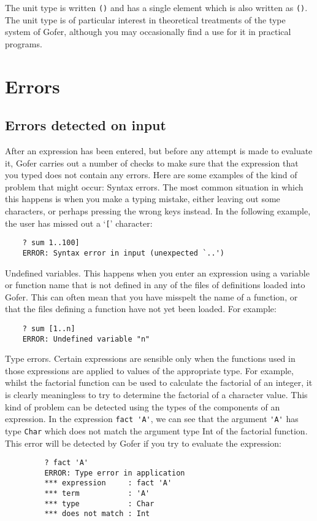 The unit type is written \verb"()" and has a  single  element  which  is  also
written as \verb"()".  The unit type is of particular interest in  theoretical
treatments of the type system of Gofer, although you  may  occasionally
find a use for it in practical programs.


\chapter{Errors}

\section{Errors detected on input}
After an expression has been entered, but before any attempt is made to
evaluate it, Gofer carries out a number of checks to make sure that the
expression that you typed does not contain any errors.  Here  are  some
examples of the kind of problem that might occur:
\BI
\IT  Syntax errors.  The most common situation in which this happens is
     when  you  make  a  typing  mistake,  either  leaving   out   some
     characters, or perhaps pressing the wrong keys  instead.   In  the
     following example, the user has missed out a `\verb"["' character:
\begin{verbatim}
    ? sum 1..100]
    ERROR: Syntax error in input (unexpected `..')
\end{verbatim}
\IT  Undefined variables.  This happens when you  enter  an  expression
     using a variable or function name that is not defined  in  any  of
     the files of definitions loaded into Gofer.  This can  often  mean
     that you have misspelt the name of a function, or that  the  files
     defining a function have not yet been loaded.  For example:
\begin{verbatim}
    ? sum [1..n]
    ERROR: Undefined variable "n"
\end{verbatim}
\IT  Type errors.  Certain  expressions  are  sensible  only  when  the
     functions used in those expressions are applied to values  of  the
     appropriate type.  For example, whilst the factorial function  can
     be used to calculate the factorial of an integer,  it  is  clearly
     meaningless to try to  determine  the  factorial  of  a  character
     value.  This kind of problem can be detected using  the  types  of
     the components of an expression.  In the expression \verb"fact 'A'", we
     can see that the argument \verb"'A'" has type \verb"Char"
     which does  not  match
     the argument type Int of the factorial function.  This error  will
     be detected by Gofer if you try to evaluate the expression:
\begin{verbatim}
         ? fact 'A'
         ERROR: Type error in application
         *** expression     : fact 'A'
         *** term           : 'A'
         *** type           : Char
         *** does not match : Int
\end{verbatim}
\EI

